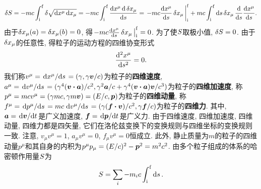 \begin{equation*}
    \var{\action} = -mc \int_{\init}^{\fini} \var{\sqrt{\dd{x^{\mu}} \dd{x_{\mu}}}} = -mc \int_{\init}^{\fini} \frac{\dd{x^{\mu}} \dd{\var{x_{\mu}}}}{\dd{s}} = \eval{-mc \dv{x^{\mu}}{s} \var{x_{\mu}}}_{\init}^{\fini} + mc \int_{\init}^{\fini} \dd{s} \var{x_{\mu}} \dv{s} \dv{x^{\mu}}{s}.
\end{equation*}
由于$ \var{x_{\mu}(a)}=\var{x_{\mu}(b)}=0 $, 得$ \eval{-mc \dv{x^{\mu}}{s} \var{x_{\mu}}}_{\init}^{\fini}=0 $. 为了使$ S $取极小值, $ \var{S}=0 $. 由于$ \var{x_{\mu}} $的任意性, 得粒子的运动方程的四维协变形式
\begin{equation}
    \dv[2]{x^{\mu}}{s} = 0.
\end{equation}
我们称$ v^{\mu}=\dv*{x^{\mu}}{s}=(\gamma,\gamma \vb*{v}/c) $为粒子的\textbf{四维速度}, $ a^{\mu}=\dv*{v^{\mu}}{s}=(\gamma^4 (\vb*{v} \vdot \vb*{a})/c^2,\gamma^2\vb*{a}/c + \gamma^4 (\vb*{v} \vdot \vb*{a}) \vb*{v}/c^3) $为粒子的\textbf{四维加速度}, 称$ p^{\mu} = mcv^{\mu}= (\gamma mc, \gamma m \vb*{v}) = (E/c,\vb*{p}) $为粒子的\textbf{四维动量}, 称$ f^{\mu}=\dv*{p^{\mu}}{s}=mc\dv*{v^{\mu}}{s}=(\gamma (\vb*{f} \vdot \vb*{v})/c^2,\gamma\vb*{f}/c) $为粒子的\textbf{四维力}. 其中, $ \vb*{a}=\dv*{\vb*{v}}{t} $是广义加速度, $ \vb*{f}=\dv*{\vb*{p}}{t} $是广义力. 由于四维速度, 四维加速度, 四维动量, 四维力都是四矢量, 它们在洛伦兹变换下的变换规则与四维坐标的变换规则一致. 注意, $ v_{\mu} v^{\mu}=1 $, $ a_{\mu} v^{\mu}=0 $, $ f_{\mu} v^{\mu} = 0 $恒成立. 此外, 静止质量为$ m $的粒子的四维动量$ p^{\mu} $和其自身的内积为$ p^{\mu} p_{\mu} = (E/c)^2 - \vb*{p}^2 = m^2 c^2 $. 由多个粒子组成的体系的哈密顿作用量$ S $为
\begin{equation*}
    S = \sum_i -m_i c \int_{\mathrm{i}}^{\mathrm{f}} \dd{s}.
\end{equation*}

